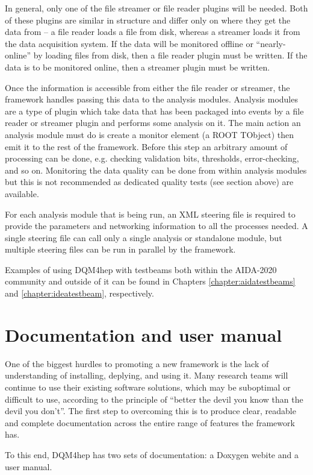 In general, only one of the file streamer or file reader plugins will be needed. Both of these plugins are similar in structure and differ only on where they get the data from -- a file reader loads a file from disk, whereas a streamer loads it from the data acquisition system. If the data will be monitored offline or ``nearly-online'' by loading files from disk, then a file reader plugin must be written. If the data is to be monitored online, then a streamer plugin must be written. 

Once the information is accessible from either the file reader or streamer, the framework handles passing this data to the analysis modules. Analysis modules are a type of plugin which take data that has been packaged into events by a file reader or streamer plugin and performs some analysis on it. The main action an analysis module must do is create a monitor element (a ROOT TObject) then emit it to the rest of the framework. Before this step an arbitrary amount of processing can be done, e.g. checking validation bits, thresholds, error-checking, and so on. Monitoring the data quality can be done from within analysis modules but this is not recommended as dedicated quality tests (see section above) are available.

For each analysis module that is being run, an XML steering file is required to provide the parameters and networking information to all the processes needed. A single steering file can call only a single analysis or standalone module, but multiple steering files can be run in parallel by the framework.

Examples of using DQM4hep with testbeams both within the AIDA-2020 community and outside of it can be found in Chapters \ref{chapter:aidatestbeams} and \ref{chapter:ideatestbeam}, respectively.

\section{Documentation and user manual}
One of the biggest hurdles to promoting a new framework is the lack of understanding of installing, deplying, and using it. Many research teams will continue to use their existing software solutions, which may be suboptimal or difficult to use, according to the principle of ``better the devil you know than the devil you don't''. The first step to overcoming this is to produce clear, readable and complete documentation across the entire range of features the framework has.

To this end, DQM4hep has two sets of documentation: a Doxygen webite and a user manual.

